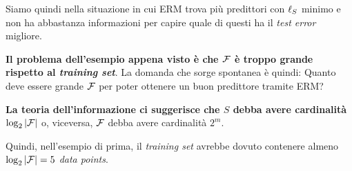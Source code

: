 Siamo quindi nella situazione in cui ERM trova più predittori con $\ell_S$ minimo e non
ha abbastanza informazioni per capire quale di questi ha il \textit{test error} migliore.

\textbf{Il problema dell'esempio appena visto è che $\mathcal{F}$ è troppo grande rispetto al
\textit{training set}}. La domanda che sorge spontanea è quindi: Quanto deve essere 
grande $\mathcal{F}$ per poter ottenere un buon predittore tramite ERM?

\textbf{La teoria dell'informazione ci suggerisce che $S$ debba avere cardinalità
$\log_2{|\mathcal{F}|}$} o, viceversa, $\mathcal{F}$ debba avere cardinalità $2^m$.

Quindi, nell'esempio di prima, il \textit{training set} avrebbe dovuto contenere almeno
$\log_2{|\mathcal{F}|}=5$ \textit{data points}.
